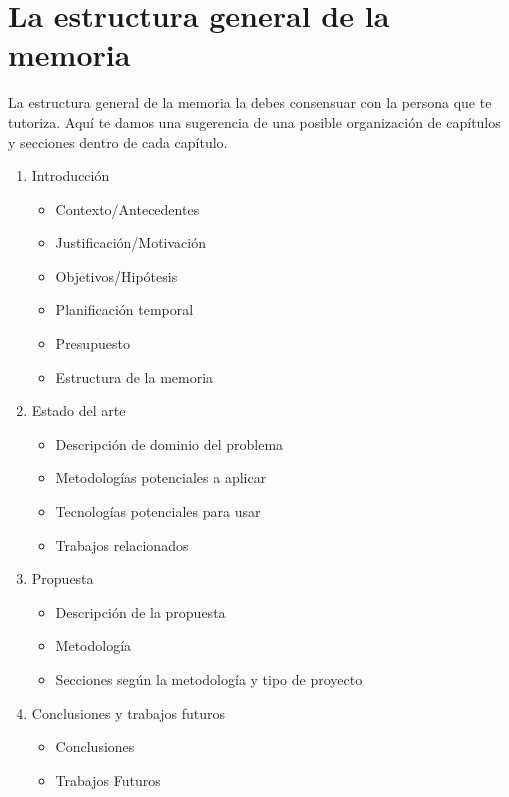 \chapter{La estructura general de la memoria}
\label{cap:EstructuraMemoria}
La estructura general de la memoria la debes consensuar con la persona que te tutoriza. Aquí te damos una sugerencia de una posible organización de capítulos y secciones dentro de cada capítulo.


\begin{enumerate}
    \item Introducción
        \begin{itemize}
            \item Contexto/Antecedentes
            \item Justificación/Motivación
            \item Objetivos/Hipótesis
            \item Planificación temporal
            \item Presupuesto
            \item Estructura de la memoria
        \end{itemize}
    \item Estado del arte
        \begin{itemize}
            \item Descripción de dominio del problema
            \item Metodologías potenciales a aplicar
            \item Tecnologías potenciales para usar
            \item Trabajos relacionados
        \end{itemize}
    \item Propuesta
    \begin{itemize}
            \item Descripción de la propuesta
            \item Metodología
            \item Secciones según la metodología y tipo de proyecto
        \end{itemize}
    \item Conclusiones y trabajos futuros
    \begin{itemize}
            \item Conclusiones
            \item Trabajos Futuros
        \end{itemize}
\end{enumerate}

